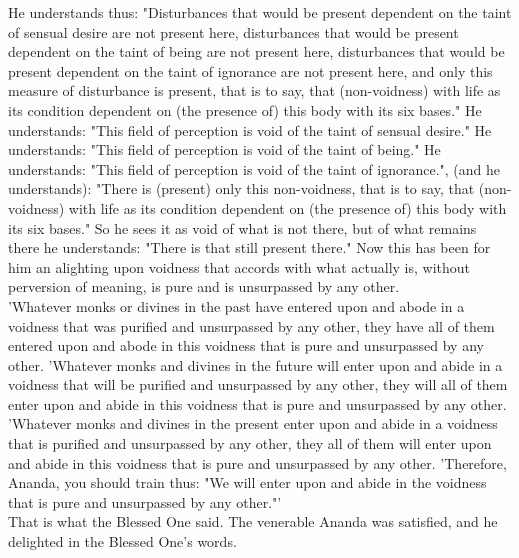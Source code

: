 \documentclass[11pt]{article}
\begin{document}
He understands thus: "Disturbances that would be present dependent on the taint of sensual desire are not present here, disturbances that would be present dependent on the taint of being are not present here, disturbances that would be present dependent on the taint of ignorance are not present here, and only this measure of disturbance is present, that is to say, that (non-voidness) with life as its condition dependent on (the presence of) this body with its six bases." He understands: "This field of perception is void of the taint of sensual desire." He understands: "This field of perception is void of the taint of being." He understands: "This field of perception is void of the taint of ignorance.", (and he understands): "There is (present) only this non-voidness, that is to say, that (non-voidness) with life as its condition dependent on (the presence of) this body with its six bases." So he sees it as void of what is not there, but of what remains there he understands: "There is that still present there." Now this has been for him an alighting upon voidness that accords with what actually is, without perversion of meaning, is pure and is unsurpassed by any other.\\

 'Whatever monks or divines in the past have entered upon and abode in a voidness that was purified and unsurpassed by any other, they have all of them entered upon and abode in this voidness that is pure and unsurpassed by any other.
'Whatever monks and divines in the future will enter upon and abide in a voidness that will be purified and unsurpassed by any other, they will all of them enter upon and abide in this voidness that is pure and unsurpassed by any other.
'Whatever monks and divines in the present enter upon and abide in a voidness that is purified and unsurpassed by any other, they all of them will enter upon and abide in this voidness that is pure and unsurpassed by any other.
'Therefore, Ananda, you should train thus: "We will enter upon and abide in the voidness that is pure and unsurpassed by any other."'\\

That is what the Blessed One said. The venerable Ananda was satisfied, and he delighted in the Blessed One's words.
\end{document}
